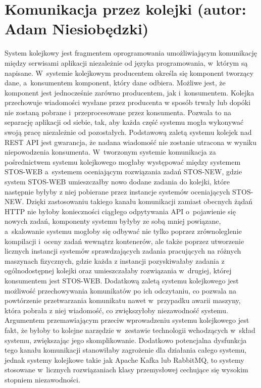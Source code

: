 \section{Komunikacja przez kolejki (autor: Adam Niesiobędzki)}
System kolejkowy jest fragmentem oprogramowania umożliwiającym komunikację między serwisami aplikacji niezależnie od języka programowania, w~którym są napisane. W~systemie kolejkowym producentem określa się komponent tworzący dane, a~konsumentem komponent, który dane odbiera. Możliwe jest, że komponent jest jednocześnie zarówno producentem, jak i~konsumentem. Kolejka przechowuje wiadomości wysłane przez producenta w sposób trwały lub dopóki nie zostaną pobrane i~przeprocesowane przez konsumenta. Pozwala to na separację aplikacji od siebie, tak, aby każda część systemu mogła wykonywać swoją pracę niezależnie od pozostałych. Podstawową zaletą systemu kolejek nad REST API jest gwarancja, że nadana wiadomość nie zostanie utracona w wyniku niepowodzenia konsumenta. W~tworzonym systemie komunikacja za pośrednictwem systemu kolejkowego mogłaby występować między systemem STOS-WEB a~systemem oceniającym rozwiązania zadań STOS-NEW, gdzie system STOS-WEB umieszczałby nowo dodane zadania do kolejki, które następnie byłyby z niej pobierane przez instancje systemów oceniających STOS-NEW. Dzięki zastosowaniu takiego kanału komunikacji zamiast obecnych żądań HTTP nie byłoby konieczności ciągłego odpytywania API o~pojawienie się nowych zadań, komponenty systemu byłyby ze sobą mniej powiązane, a~skalowanie systemu mogłoby się odbywać nie tylko poprzez zrównoleglenie kompilacji i~oceny zadań wewnątrz kontenerów, ale także poprzez utworzenie licznych instancji systemów sprawdzających zadania pracujących na różnych maszynach fizycznych, gdzie każda z instancji pozyskiwałaby zadania z ogólnodostępnej kolejki oraz umieszczałaby rozwiązania w~drugiej, której konsumentem jest STOS-WEB. Dodatkową zaletą systemu kolejkowego jest możliwość przechowywania komunikatów po ich odczytaniu, co pozwala na powtórzenie przetwarzania komunikatu nawet w~przypadku awarii maszyny, która pobrała z niej wiadomość, co zwiększyłoby niezawodność systemu. Argumentem przemawiającym przeciw wprowadzeniu systemu kolejkowego jest fakt, że byłoby to kolejne narzędzie w~zestawie technologii wchodzących w~skład systemu, zwiększając jego skomplikowanie. Dodatkowo potencjalna dysfunkcja tego kanału komunikacji stanowiłaby zagrożenie dla działania całego systemu, jednak systemy kolejkowe takie jak Apache Kafka lub RabbitMQ, to systemy stosowane w~licznych rozwiązaniach klasy przemysłowej cechujące się wysokim stopniem niezawodności.
